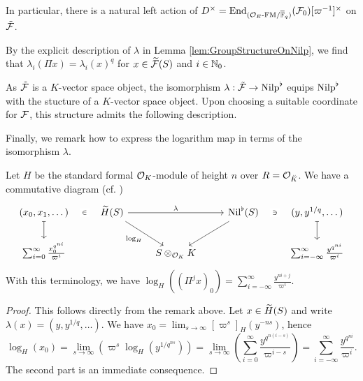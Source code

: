 \documentclass[../main.tex]{subfiles}
\begin{document}
In particular, there is a natural left action of 
$D^\times = \End_{\FMOver {\cO_E} \Fqbar}(\cF_0)[\varpi^{-1}]^\times$ on $\tilde \cF$. 

By the explicit description of $\lambda$ in Lemma
\ref{lem:GroupStructureOnNilp}, we find that $\lambda_i(\Pi x) =
\lambda_i(x)^q$ for $x \in \Tilde \cF(S)$ and $i\in \N_0$. 

As $\tilde \cF$ is a $K$-vector space
object, the isomorphism $\lambda: \tilde \cF \to \Nilp^\flat$ equips
$\Nilp^\flat$ with the stucture of a $K$-vector space object. Upon choosing a 
suitable coordinate for $\cF$, this structure admits the following description.


Finally, we remark how to express the logarithm map in terms of the isomorphism
$\lambda$.


\begin{lem}\label{lem:LogInTermsOfNil}
  Let $H$ be the standard formal $\cO_K$-module of height $n$ over $R =
  \cO_{\breve K}$. We have a commutative diagram (cf. \cite[Lemma
  2.6.1]{BoyarchenkoWeinstein2011MaxVar})
  \begin{equation*}
  \begin{tikzcd}[ampersand replacement=\&]
  	{(x_0, x_1, \dots)} \& {\Tilde H(S)} \&\& {\Nil^\flat(S)} \& {(y,y^{1/q}, \dots)} \\
  	{\sum_{i=0}^\infty \frac{x_0^{q^{ni}}}{\varpi^i}} \&\& {S\otimes_{\cO_K}K} \&\& {\sum_{i = -\infty}^\infty\frac{y^{q^{ni}}}{\varpi^i}}
  	\arrow["\in"{description}, draw=none, from=1-1, to=1-2]
  	\arrow[maps to, from=1-1, to=2-1]
  	\arrow["\lambda", from=1-2, to=1-4]
  	\arrow["{\log_H}"', from=1-2, to=2-3]
  	\arrow[from=1-4, to=2-3]
  	\arrow["\ni"{description}, draw=none, from=1-5, to=1-4]
  	\arrow[maps to, from=1-5, to=2-5]
  \end{tikzcd}
  \end{equation*}
  With this terminology, we have $\log_H((\Pi^j x)_0) = \sum_{i = -\infty}^\infty
  \frac{ y^{ni + j}}{\varpi^i}$. 
\begin{proof}
  This follows directly from the remark above. Let $x \in \Tilde H(S)$ and write
  $\lambda(x) = (y, y^{1/q}, \dots)$. We have $x_0 = \lim_{s \to \infty}
  [\varpi^s]_H(y^{-ns})$, hence
  \begin{equation*}
    \log_H(x_0) = \lim_{s \to \infty}\left( \varpi^s \log_H(y^{1/q^{ns}})\right) = 
    \lim_{s \to \infty}\left( \sum_{i=0}^\infty  \frac{y^{q^{n(i-s)}}}{\varpi^{i-s}}\right)
    = \sum_{i=-\infty}^\infty \frac{y^{q^{ni}}}{\varpi^i}.
  \end{equation*}
  The second part is an immediate consequence.
\end{proof}
\end{lem}
\end{document}
